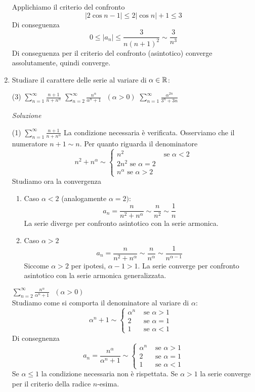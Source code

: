 \documentclass{article}
\newcommand{\se}{\text{ se }}
\begin{document}
\begin{enumerate}[label=\textbf{Esercizio 9.\arabic*.},itemindent=*]
\begin{tasks}
        Applichiamo il criterio del confronto \[|2\cos n-1|\leq 2|\cos n|+1\leq 3\]
        Di conseguenza
        \[0\leq |a_n|\leq \frac{3}{n(n+1)^2}\sim \frac{3}{n^3}\]
        Di conseguenza per il criterio del confronto (asintotico) converge assolutamente, quindi converge.
    \end{tasks}
    \item Studiare il carattere delle serie al variare di $\alpha\in \mathbb{R}$:
    \begin{tasks}(3)
        \task $\sum_{n=1}^\infty\frac{n+1}{n+n^\alpha}$
        \task $\sum_{n=2}^\infty\frac{n^\alpha}{\alpha^n+1}~~~(\alpha>0)$
        \task $\sum_{n=1}^\infty\frac{\alpha^{2n}}{3^n+3n}$
    \end{tasks}
    \item[\textit{\large Soluzione~}]~
    \begin{tasks}(1)
        \task $\sum_{n=1}^\infty\frac{n+1}{n+n^\alpha}$
        La condizione necessaria è verificata. Osserviamo che il numeratore $n+1\sim n$. Per quanto riguarda il denominatore
        \[n^2+n^\alpha\sim\begin{cases}
            n^2&\se \alpha<2\\
            2n^2\se \alpha=2\\
            n^\alpha \se \alpha>2
        \end{cases}\]
        Studiamo ora la convergenza
        \begin{enumerate}
            \item Caso $\alpha<2$ (analogamente $\alpha=2)$:
                \[a_n=\frac{n}{n^2+n^\alpha}\sim \frac{n}{n^2}\sim \frac{1}{n}\]
                La serie diverge per confronto asintotico con la serie armonica. 
            \item Caso $\alpha>2$
                \[a_n=\frac{n}{n^2+n^\alpha}\sim \frac{n}{n^\alpha}\sim \frac{1}{n^{\alpha-1}}\]
                Siccome $\alpha >2$ per ipotesi, $\alpha-1>1$. La serie converge per confronto asintotico con la serie armonica generalizzata.
        \end{enumerate}
        \task $\sum_{n=2}^\infty\frac{n^\alpha}{\alpha^n+1}~~~(\alpha>0)$
        \\Studiamo come si comporta il denominatore al variare di $\alpha$:
        \[\alpha^{n}+1\sim\begin{cases}
            \alpha^n&\se \alpha>1\\
            2 &\se \alpha=1&\\
            1 &\se \alpha<1
        \end{cases}\]
        Di consegnenza
        \[a_n=\frac{n^\alpha}{\alpha^{n}+1}\sim\begin{cases}
            \alpha^n&\se \alpha>1\\
            2 &\se \alpha=1\\
            1 &\se \alpha<1
        \end{cases}\]
        Se $\alpha\leq 1$ la condizione necessaria non è rispettata. Se $\alpha>1$ la serie converge per il criterio della radice $n$-esima.


\end{tasks}
\end{enumerate}
\end{document}
